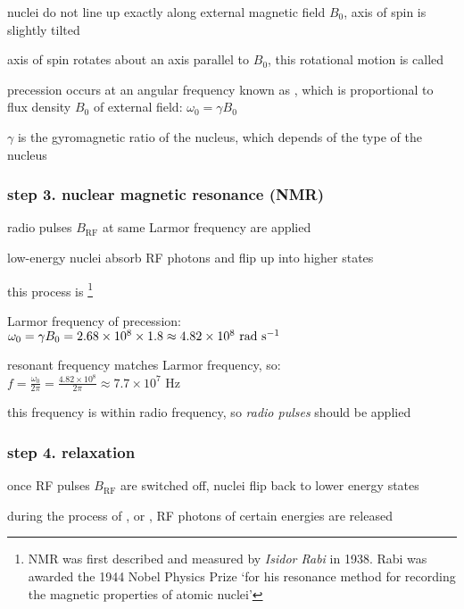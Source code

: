 nuclei do not line up exactly along external magnetic field $B_0$, axis of spin is slightly tilted

axis of spin rotates about an axis parallel to $B_0$, this rotational motion is called 

precession occurs at an angular frequency known as , which is proportional to flux density $B_0$ of external field: $\boxed{\omega_0 = \gamma B_0}$

$\gamma$ is the gyromagnetic ratio of the nucleus, which depends of the type of the nucleus

\subsubsection*{step 3. nuclear magnetic resonance (NMR)}

radio pulses $B_\text{RF}$ at same Larmor frequency are applied

low-energy nuclei absorb RF photons and flip up into higher states

this process is  \footnote{NMR was first described and measured by \emph{Isidor Rabi} in 1938. Rabi was awarded the 1944 Nobel Physics Prize `for his resonance method for recording the magnetic properties of atomic nuclei'}


\sol Larmor frequency of precession: $\omega_0 = \gamma B_0 = 2.68\times10^8 \times 1.8 \approx 4.82\times 10^8 \text{ rad s$^{-1}$}$

resonant frequency matches Larmor frequency, so: $f=\frac{\omega_0}{2\pi} = \frac{4.82\times 10^8}{2\pi} \approx 7.7\times10^7 \text{ Hz}$

this frequency is within radio frequency, so \emph{radio pulses} should be applied \eoe


\subsubsection*{step 4. relaxation}

once RF pulses $B_\text{RF}$ are switched off, nuclei flip back to lower energy states

during the process of , or , RF photons of certain energies are released

